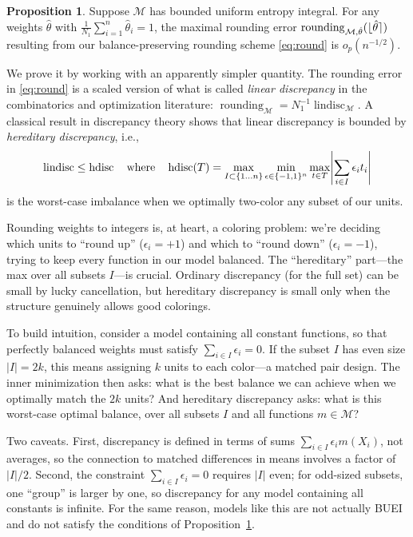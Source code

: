 \documentclass{article}
\DeclarePairedDelimiter\abs{\lvert}{\rvert}
\theoremstyle{definition}
\newtheorem{proposition}[theorem]{Proposition}
\DeclarePairedDelimiter\round{\lfloor}{\rceil}
\DeclareMathOperator{\roundingerror}{rounding}
\DeclareMathOperator{\hdisc}{hdisc}
\DeclareMathOperator{\lindisc}{lindisc}
\newcommand{\model}{\mathcal{M}}
\newcommand{\<}{\langle}
\renewcommand{\>}{\rangle}
\begin{document}
\begin{proposition}
\label{prop:rounding}
Suppose $\model$ has bounded uniform entropy integral. For any weights $\hat \theta$ with $\frac{1}{N_1}\sum_{i=1}^n \hat\theta_i = 1$,
the maximal rounding error $\roundingerror_{\model, \hat\theta}(\round{\hat\theta})$ resulting from our balance-preserving rounding scheme \eqref{eq:round} is  $o_p(n^{-1/2})$.
\end{proposition}


We prove it by working with an apparently simpler quantity. The rounding error in \eqref{eq:round} is a scaled version of what is called \emph{linear discrepancy} in the combinatorics and optimization literature: $\roundingerror_\model = N_1^{-1} \lindisc_\model$. A classical result in discrepancy theory \citep{lovasz1986discrepancy} shows that linear discrepancy is bounded by \emph{hereditary discrepancy}, i.e.,
\begin{equation}
\label{eq:hdisc}
\lindisc \le \hdisc \quad \text{where} \quad \hdisc(T) = \max_{I \subset \{1 \ldots n\}}\min_{\epsilon \in \{-1,1\}^n}\max_{t \in T} \abs*{\sum_{i\in I} \epsilon_i t_i}
\end{equation}
is the worst-case imbalance when we optimally two-color any subset of our units.

Rounding weights to integers is, at heart, a coloring problem: we're deciding which units to ``round up'' ($\epsilon_i = +1$) and which to ``round down'' ($\epsilon_i = -1$), trying to keep every function in our model balanced. The ``hereditary'' part---the max over all subsets $I$---is crucial. Ordinary discrepancy (for the full set) can be small by lucky cancellation, but hereditary discrepancy is small only when the structure genuinely allows good colorings.

To build intuition, consider a model containing all constant functions, so that perfectly balanced weights must satisfy $\sum_{i \in I} \epsilon_i = 0$. If the subset $I$ has even size $|I| = 2k$, this means assigning $k$ units to each color---a matched pair design. The inner minimization then asks: what is the best balance we can achieve when we optimally match the $2k$ units? And hereditary discrepancy asks: what is this worst-case optimal balance, over all subsets $I$ and all functions $m \in \model$?

Two caveats. First, discrepancy is defined in terms of sums $\sum_{i \in I} \epsilon_i m(X_i)$, not averages, so the connection to matched differences in means involves a factor of $|I|/2$. Second, the constraint $\sum_{i \in I} \epsilon_i = 0$ requires $|I|$ even; for odd-sized subsets, one ``group'' is larger by one, so discrepancy for any model containing all constants is infinite. For the same reason, models like this are not actually BUEI and do not satisfy the conditions of Proposition~\ref{prop:rounding}.
\end{document}
